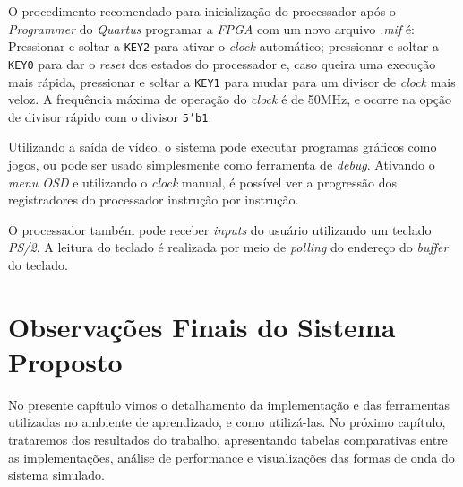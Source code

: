     { O procedimento recomendado para inicialização do processador após o
        \textit{Programmer} do \textit{Quartus} programar a \textit{FPGA} com
        um novo arquivo \textit{.mif} é: Pressionar e soltar a \texttt{KEY2}
        para ativar o \textit{clock} automático; pressionar e soltar a
        \texttt{KEY0} para dar o \textit{reset} dos estados do processador e,
        caso queira uma execução mais rápida, pressionar e soltar a \texttt{KEY1}
        para mudar para um divisor de \textit{clock} mais veloz. A frequência
        máxima de operação do \textit{clock} é de 50MHz, e ocorre na opção de
        divisor rápido com o divisor \texttt{5'b1}.
    }

    { Utilizando a saída de vídeo, o sistema pode executar programas gráficos
        como jogos, ou pode ser usado simplesmente como ferramenta de \textit{debug}.
        Ativando o \textit{menu OSD} e utilizando o \textit{clock} manual, é
        possível ver a progressão dos registradores do processador instrução por
        instrução.
    }

    { O processador também pode receber \textit{inputs} do usuário utilizando
        um teclado \textit{PS/2}. A leitura do teclado é realizada por meio de
        \textit{polling} do endereço do \textit{buffer} do teclado.
    }



\section{Observações Finais do Sistema Proposto}
    { No presente capítulo vimos o detalhamento da implementação e das ferramentas
        utilizadas no ambiente de aprendizado, e como utilizá-las. No próximo
        capítulo, trataremos dos resultados do trabalho, apresentando tabelas
        comparativas entre as implementações, análise de performance e visualizações
        das formas de onda do sistema simulado.
    }

